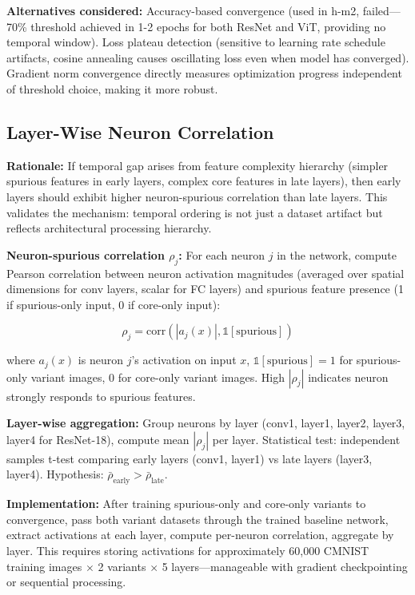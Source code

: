 \textbf{Alternatives considered:} Accuracy-based convergence (used in h-m2, failed---70\% threshold achieved in 1-2 epochs for both ResNet and ViT, providing no temporal window). Loss plateau detection (sensitive to learning rate schedule artifacts, cosine annealing causes oscillating loss even when model has converged). Gradient norm convergence directly measures optimization progress independent of threshold choice, making it more robust.

\subsection{Layer-Wise Neuron Correlation}

\textbf{Rationale:} If temporal gap arises from feature complexity hierarchy (simpler spurious features in early layers, complex core features in late layers), then early layers should exhibit higher neuron-spurious correlation than late layers. This validates the mechanism: temporal ordering is not just a dataset artifact but reflects architectural processing hierarchy.

\textbf{Neuron-spurious correlation $\rho_j$:} For each neuron $j$ in the network, compute Pearson correlation between neuron activation magnitudes (averaged over spatial dimensions for conv layers, scalar for FC layers) and spurious feature presence (1 if spurious-only input, 0 if core-only input):

\begin{equation}
\rho_j = \text{corr}(|a_j(x)|, \mathbb{1}[\text{spurious}])
\end{equation}

where $a_j(x)$ is neuron $j$'s activation on input $x$, $\mathbb{1}[\text{spurious}] = 1$ for spurious-only variant images, $0$ for core-only variant images. High $|\rho_j|$ indicates neuron strongly responds to spurious features.

\textbf{Layer-wise aggregation:} Group neurons by layer (conv1, layer1, layer2, layer3, layer4 for ResNet-18), compute mean $|\rho_j|$ per layer. Statistical test: independent samples t-test comparing early layers (conv1, layer1) vs late layers (layer3, layer4). Hypothesis: $\bar{\rho}_{\text{early}} > \bar{\rho}_{\text{late}}$.

\textbf{Implementation:} After training spurious-only and core-only variants to convergence, pass both variant datasets through the trained baseline network, extract activations at each layer, compute per-neuron correlation, aggregate by layer. This requires storing activations for approximately 60,000 CMNIST training images $\times$ 2 variants $\times$ 5 layers---manageable with gradient checkpointing or sequential processing.

